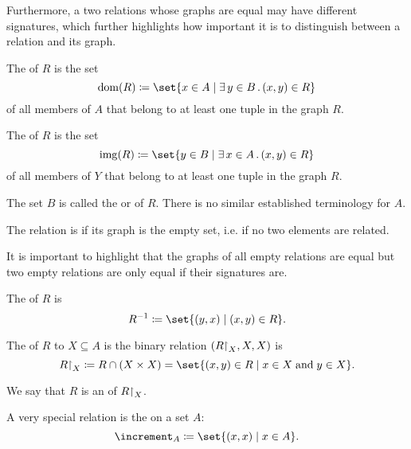 \begin{definition}
\begin{thmenum}[series=def:binary_relation]
    Furthermore, a two relations whose graphs are equal may have different signatures, which further highlights how important it is to distinguish between a relation and its graph.

     The  of \( R \) is the set
    \begin{equation*}
      \dom(R) \coloneqq \set{ x \in A \given \qexists {y \in B} (x, y) \in R }
    \end{equation*}
    of all members of \( A \) that belong to at least one tuple in the graph \( R \).

     The  of \( R \) is the set
    \begin{equation*}
      \img(R) \coloneqq \set{ y \in B \given \qexists {x \in A} (x, y) \in R }
    \end{equation*}
    of all members of \( Y \) that belong to at least one tuple in the graph \( R \).

     The set \( B \) is called the  or  of \( R \). There is no similar established terminology for \( A \).

     The relation is  if its graph is the empty set, i.e. if no two elements are related.

    It is important to highlight that the graphs of all empty relations are equal but two empty relations are only equal if their signatures are.

     The  of \( R \) is
    \begin{equation*}
      R^{-1} \coloneqq \set{ (y, x) \given (x, y) \in R }.
    \end{equation*}

     The  of \( R \) to \( X \subseteq A \) is the binary relation \( (R{\upharpoonright}_{X}, X, X) \) is
    \begin{equation*}
      R\restr_{X} \coloneqq R \cap (X \times X) = \set{ (x, y) \in R \given x \in X \T{and} y \in X }.
    \end{equation*}

    We say that \( R \) is an  of \( R{\upharpoonright}_{X} \).

     A very special relation is the  on a set \( A \):
    \begin{equation*}
      \increment_A \coloneqq \set{ (x, x) \given x \in A }.
    \end{equation*}


\end{thmenum}
\end{definition}

